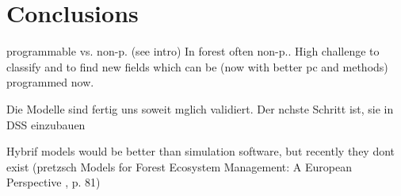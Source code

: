 \chapter{Conclusions}
\label{chap:discussion}
programmable vs. non-p. (see intro) In forest often non-p.. High challenge to classify and to find new fields which can be (now with better pc and methods) programmed now.

Die Modelle sind fertig uns soweit mglich validiert. Der nchste Schritt ist, sie in DSS einzubauen

Hybrif models would be better than simulation software, but recently they dont exist (pretzsch Models for Forest Ecosystem Management: A European Perspective
, p. 81)